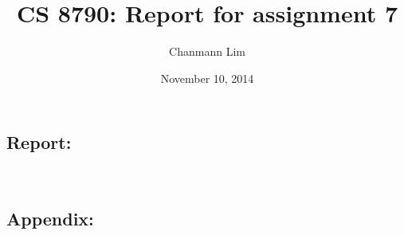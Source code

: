 \documentclass[a4paper]{article}
\begin{document}
\title{CS 8790: Report for assignment 7}
\author{Chanmann Lim}
\date{November 10, 2014}
\maketitle

\subsection*{Report:} ~\\


\newpage
\subsection*{Appendix:}






\end{document}
